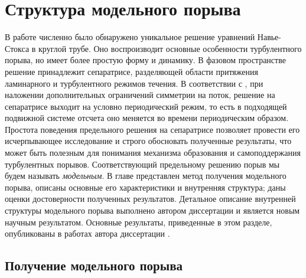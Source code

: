 
\chapter{Структура модельного порыва}


В работе \cite{Avila2013} численно было обнаружено уникальное решение уравнений Навье-Стокса в круглой трубе. Оно воспроизводит основные особенности турбулентного порыва, но имеет более простую форму и динамику. В фазовом пространстве решение принадлежит сепаратрисе, разделяющей области притяжения ламинарного и турбулентного режимов течения. В соответствии с \cite{Avila2013}, при наложении дополнительных ограничений симметрии на поток, решение на сепаратрисе выходит на условно периодический режим, то есть в подходящей подвижной системе отсчета оно меняется во времени периодическим образом. Простота поведения предельного решения на сепаратрисе позволяет провести его исчерпывающее исследование и строго обосновать полученные результаты, что может быть полезным для понимания механизма образования и самоподдержания турбулентных порывов. Соответствующий предельному решению порыв мы будем называть {\it модельным}. В главе представлен метод получения модельного порыва, описаны основные его характеристики и внутренняя структура; даны оценки достоверности полученных результатов. Детальное описание внутренней структуры модельного порыва выполнено автором диссертации и является новым научным результатом. Основные результаты, приведенные в этом разделе, опубликованы в работах автора диссертации \cite{MZG2015, Kazan2015, KMU2015}. 


\section{Получение модельного порыва} \label{edge_seq}

